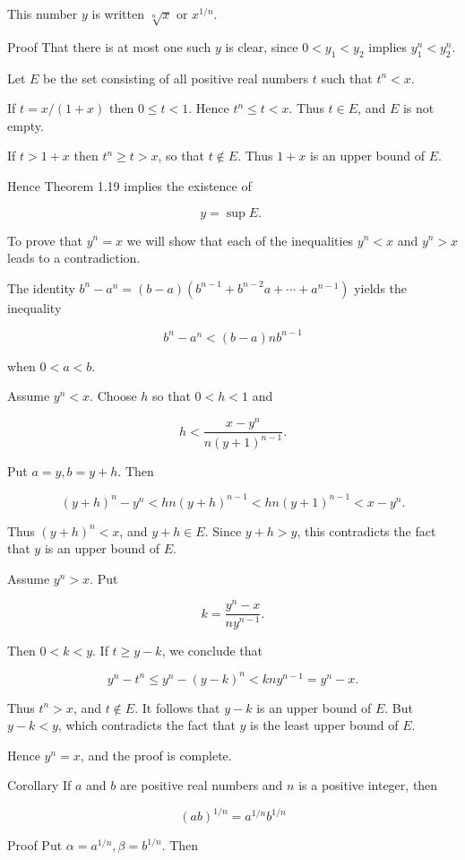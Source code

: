 \documentclass[10pt]{article}
\begin{document}
This number $y$ is written $\sqrt[n]{x}$ or $x^{1 / n}$.

Proof That there is at most one such $y$ is clear, since $0<y_{1}<y_{2}$ implies $y_{1}^{n}<y_{2}^{n}$.

Let $E$ be the set consisting of all positive real numbers $t$ such that $t^{n}<x$.

If $t=x /(1+x)$ then $0 \leq t<1$. Hence $t^{n} \leq t<x$. Thus $t \in E$, and $E$ is not empty.

If $t>1+x$ then $t^{n} \geq t>x$, so that $t \notin E$. Thus $1+x$ is an upper bound of $E$.

Hence Theorem 1.19 implies the existence of

$$
y=\sup E \text {. }
$$

To prove that $y^{n}=x$ we will show that each of the inequalities $y^{n}<x$ and $y^{n}>x$ leads to a contradiction.

The identity $b^{n}-a^{n}=(b-a)\left(b^{n-1}+b^{n-2} a+\cdots+a^{n-1}\right)$ yields the inequality

$$
b^{n}-a^{n}<(b-a) n b^{n-1}
$$

when $0<a<b$.

Assume $y^{n}<x$. Choose $h$ so that $0<h<1$ and

$$
h<\frac{x-y^{n}}{n(y+1)^{n-1}} .
$$

Put $a=y, b=y+h$. Then

$$
(y+h)^{n}-y^{n}<h n(y+h)^{n-1}<h n(y+1)^{n-1}<x-y^{n} .
$$

Thus $(y+h)^{n}<x$, and $y+h \in E$. Since $y+h>y$, this contradicts the fact that $y$ is an upper bound of $E$.

Assume $y^{n}>x$. Put

$$
k=\frac{y^{n}-x}{n y^{n-1}} .
$$

Then $0<k<y$. If $t \geq y-k$, we conclude that

$$
y^{n}-t^{n} \leq y^{n}-(y-k)^{n}<k n y^{n-1}=y^{n}-x .
$$

Thus $t^{n}>x$, and $t \notin E$. It follows that $y-k$ is an upper bound of $E$. But $y-k<y$, which contradicts the fact that $y$ is the least upper bound of $E$.

Hence $y^{n}=x$, and the proof is complete.

Corollary If $a$ and $b$ are positive real numbers and $n$ is a positive integer, then

$$
(a b)^{1 / n}=a^{1 / n} b^{1 / n}
$$

Proof Put $\alpha=a^{1 / n}, \beta=b^{1 / n}$. Then
\end{document}

